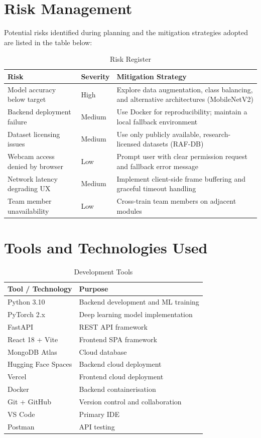 \section{Risk Management}

Potential risks identified during planning and the mitigation strategies
adopted are listed in the table below:

\begin{table}[H]
\centering
\caption{Risk Register}
\begin{tabular}{p{3.5cm} p{2cm} p{6.5cm}}
\toprule
\textbf{Risk}               & \textbf{Severity} & \textbf{Mitigation Strategy} \\
\midrule
Model accuracy below target & High   & Explore data augmentation, class balancing, and alternative architectures (MobileNetV2) \\
Backend deployment failure  & Medium & Use Docker for reproducibility; maintain a local fallback environment \\
Dataset licensing issues    & Medium & Use only publicly available, research-licensed datasets (RAF-DB) \\
Webcam access denied by browser & Low & Prompt user with clear permission request and fallback error message \\
Network latency degrading UX & Medium & Implement client-side frame buffering and graceful timeout handling \\
Team member unavailability  & Low    & Cross-train team members on adjacent modules \\
\bottomrule
\end{tabular}
\end{table}

\section{Tools and Technologies Used}

\begin{table}[H]
\centering
\caption{Development Tools}
\begin{tabular}{ll}
\toprule
\textbf{Tool / Technology} & \textbf{Purpose} \\
\midrule
Python 3.10             & Backend development and ML training \\
PyTorch 2.x             & Deep learning model implementation \\
FastAPI                 & REST API framework \\
React 18 + Vite         & Frontend SPA framework \\
MongoDB Atlas           & Cloud database \\
Hugging Face Spaces     & Backend cloud deployment \\
Vercel                  & Frontend cloud deployment \\
Docker                  & Backend containerisation \\
Git + GitHub            & Version control and collaboration \\
VS Code                 & Primary IDE \\
Postman                 & API testing \\
\bottomrule
\end{tabular}
\end{table}
